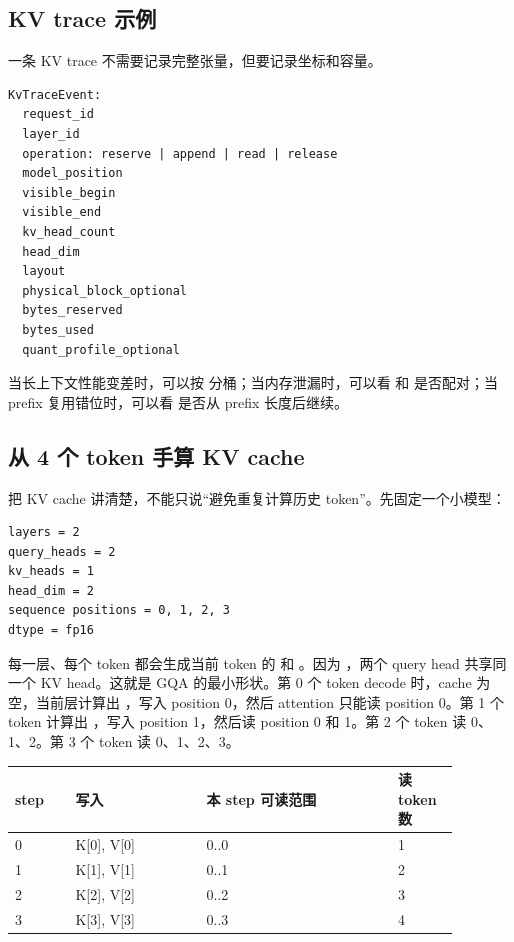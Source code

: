 \subsection{KV trace 示例}

一条 KV trace 不需要记录完整张量，但要记录坐标和容量。

\begin{lstlisting}[numbers=none,caption={KV trace event}]
KvTraceEvent:
  request_id
  layer_id
  operation: reserve | append | read | release
  model_position
  visible_begin
  visible_end
  kv_head_count
  head_dim
  layout
  physical_block_optional
  bytes_reserved
  bytes_used
  quant_profile_optional
\end{lstlisting}

当长上下文性能变差时，可以按  分桶；当内存泄漏时，可以看  和  是否配对；当 prefix 复用错位时，可以看  是否从 prefix 长度后继续。

\subsection{从 4 个 token 手算 KV cache}

把 KV cache 讲清楚，不能只说“避免重复计算历史 token”。先固定一个小模型：

\begin{lstlisting}[numbers=none,caption={KV cache 手算模型}]
layers = 2
query_heads = 2
kv_heads = 1
head_dim = 2
sequence positions = 0, 1, 2, 3
dtype = fp16
\end{lstlisting}

每一层、每个 token 都会生成当前 token 的  和 。因为 ，两个 query head 共享同一个 KV head。这就是 GQA 的最小形状。第 0 个 token decode 时，cache 为空，当前层计算出 ，写入 position 0，然后 attention 只能读 position 0。第 1 个 token 计算出 ，写入 position 1，然后读 position 0 和 1。第 2 个 token 读 0、1、2。第 3 个 token 读 0、1、2、3。

\begin{center}
\begin{tabular}{p{0.12\linewidth}p{0.26\linewidth}p{0.38\linewidth}p{0.12\linewidth}}
\toprule
step & 写入 & 本 step 可读范围 & 读 token 数 \\
\midrule
0 & K[0], V[0] & 0..0 & 1 \\
1 & K[1], V[1] & 0..1 & 2 \\
2 & K[2], V[2] & 0..2 & 3 \\
3 & K[3], V[3] & 0..3 & 4 \\
\bottomrule
\end{tabular}
\end{center}

